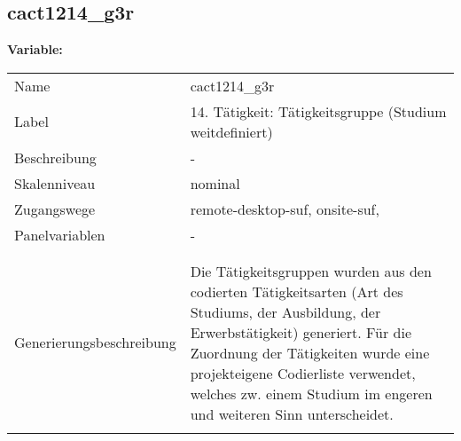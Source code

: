 	
	
	\subsection{cact1214\_g3r}
	\label{subSection:cact1214_g3r}

	\noindent\textbf{Variable:}\\
		\begin{tabular}{lL{11.3cm}}
			\label{tableVariable:cact1214_g3r}
			Name & cact1214\_g3r \\
			Label & 14. Tätigkeit: Tätigkeitsgruppe (Studium weitdefiniert) \\
			Beschreibung & - \\
			Skalenniveau & nominal \\
			Zugangswege &
				remote-desktop-suf,
				onsite-suf,
 \\
			Panelvariablen & -
			 \\
			 \\
 \\
					Generierungsbeschreibung & Die Tätigkeitsgruppen wurden aus den codierten Tätigkeitsarten (Art des Studiums, der Ausbildung, der Erwerbstätigkeit) generiert. Für die Zuordnung der Tätigkeiten wurde eine projekteigene Codierliste verwendet, welches zw. einem Studium im engeren und weiteren Sinn unterscheidet.
				 \\	
			 \\
		\end{tabular}






